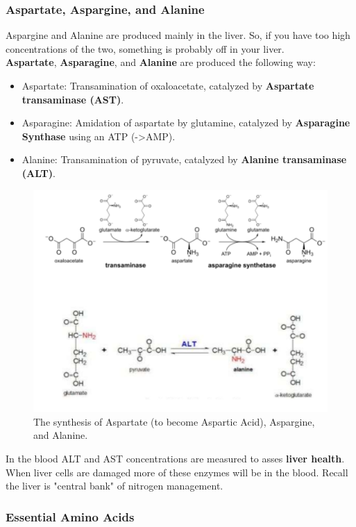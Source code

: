 \documentclass[../main.tex]{subfiles}
\begin{document}
\subsubsection{Aspartate, Aspargine, and Alanine}

Aspargine and Alanine are produced mainly in the liver. So, if you have too high concentrations of the two, something is probably off in your liver. \\

\textbf{\gls{Aspartate}}, \textbf{\gls{Asparagine}}, and \textbf{\gls{Alanine}} are produced the following way:
\begin{itemize}
	\item Aspartate: Transamination of oxaloacetate, catalyzed by \textbf{\gls{Aspartate transaminase (AST)}}.
	\item Asparagine: Amidation of aspartate by glutamine, catalyzed by \textbf{\gls{Asparagine Synthase}} using an ATP (->AMP).
	\item Alanine: Transamination of pyruvate, catalyzed by \textbf{\gls{Alanine transaminase (ALT)}}.
\end{itemize}

\begin{figure}[H]
	\centering
	\includegraphics[width=0.7\linewidth]{asp_arg_ala}
	\caption{The synthesis of Aspartate (to become Aspartic Acid), Aspargine, and Alanine.}
	\label{fig:aspargala}
\end{figure}

\begin{remark}
	In the blood ALT and AST concentrations are measured to asses \textbf{liver health}. When liver cells are damaged more of these enzymes will be in the blood. Recall the liver is "central bank" of nitrogen management.
\end{remark}


\subsubsection{Essential Amino Acids}
\end{document}
